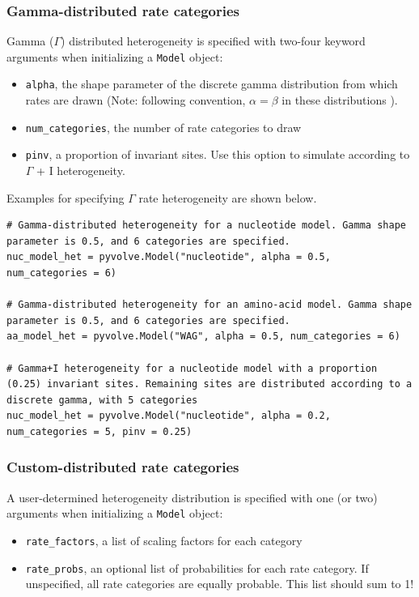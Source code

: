 \documentclass{article}
\newcommand{\code}[1]{\texttt{\small{#1}}}
\begin{document}
\subsubsection{Gamma-distributed rate categories}

Gamma ($\Gamma$) distributed heterogeneity is specified with two-four keyword arguments when initializing a \code{Model} object:
\begin{itemize}
	\item \code{alpha}, the shape parameter of the discrete gamma distribution from which rates are drawn (Note: following convention, $\alpha = \beta$ in these distributions \citep{Yang2006}).
	\item \code{num\_categories}, the number of rate categories to draw
	\item \code{pinv}, a proportion of invariant sites. Use this option to simulate according to $\Gamma$ + I heterogeneity.
\end{itemize}

Examples for specifying $\Gamma$ rate heterogeneity are shown below.

\begin{lstlisting}
# Gamma-distributed heterogeneity for a nucleotide model. Gamma shape parameter is 0.5, and 6 categories are specified.
nuc_model_het = pyvolve.Model("nucleotide", alpha = 0.5, num_categories = 6)

# Gamma-distributed heterogeneity for an amino-acid model. Gamma shape parameter is 0.5, and 6 categories are specified.
aa_model_het = pyvolve.Model("WAG", alpha = 0.5, num_categories = 6)

# Gamma+I heterogeneity for a nucleotide model with a proportion (0.25) invariant sites. Remaining sites are distributed according to a discrete gamma, with 5 categories
nuc_model_het = pyvolve.Model("nucleotide", alpha = 0.2, num_categories = 5, pinv = 0.25)
\end{lstlisting}


\subsubsection{Custom-distributed rate categories}

A user-determined heterogeneity distribution is specified with one (or two) arguments when initializing a \code{Model} object:
\begin{itemize}
	\item \code{rate\_factors}, a list of scaling factors for each category
	\item \code{rate\_probs}, an optional list of probabilities for each rate category. If unspecified, all rate categories are equally probable. This list should sum to 1!
\end{itemize}
\end{document}
